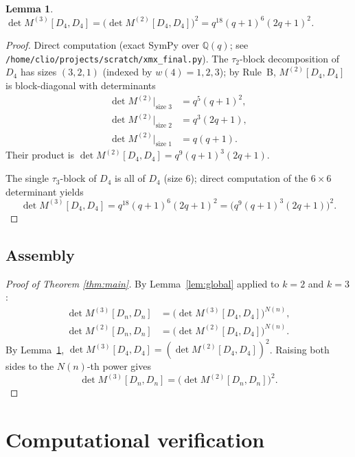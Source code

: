 \documentclass[11pt]{article}
\newtheorem{lemma}[theorem]{Lemma}
\theoremstyle{definition}
\begin{document}
\begin{lemma}
\label{lem:base}
$\det M^{(3)}[D_4, D_4] = \bigl(\det M^{(2)}[D_4, D_4]\bigr)^2 = q^{18}(q+1)^6(2q+1)^2$.
\end{lemma}

\begin{proof}
Direct computation (exact SymPy over $\mathbb{Q}(q)$; see
\texttt{/home/clio/projects/scratch/xmx\_final.py}).
The $\tau_2$-block decomposition of $D_4$ has sizes $(3, 2, 1)$ (indexed by $w(4) = 1, 2, 3$);
by Rule~B, $M^{(2)}[D_4, D_4]$ is block-diagonal with determinants
\begin{align*}
\det M^{(2)}|_{\text{size 3}} &= q^5(q+1)^2, \\
\det M^{(2)}|_{\text{size 2}} &= q^3(2q+1), \\
\det M^{(2)}|_{\text{size 1}} &= q(q+1).
\end{align*}
Their product is $\det M^{(2)}[D_4, D_4] = q^9 (q+1)^3 (2q+1)$.

The single $\tau_3$-block of $D_4$ is all of $D_4$ (size $6$); direct computation of the
$6 \times 6$ determinant yields
\[
\det M^{(3)}[D_4, D_4] = q^{18}(q+1)^6(2q+1)^2 = \bigl(q^9(q+1)^3(2q+1)\bigr)^2.
\]
\end{proof}

\subsection{Assembly}

\begin{proof}[Proof of Theorem \ref{thm:main}]
By Lemma~\ref{lem:global} applied to $k=2$ and $k=3$:
\begin{align*}
\det M^{(3)}[D_n, D_n] &= \bigl(\det M^{(3)}[D_4, D_4]\bigr)^{N(n)}, \\
\det M^{(2)}[D_n, D_n] &= \bigl(\det M^{(2)}[D_4, D_4]\bigr)^{N(n)}.
\end{align*}
By Lemma~\ref{lem:base}, $\det M^{(3)}[D_4, D_4] = (\det M^{(2)}[D_4, D_4])^2$. Raising both
sides to the $N(n)$-th power gives
\[
\det M^{(3)}[D_n, D_n] = \bigl(\det M^{(2)}[D_n, D_n]\bigr)^2.
\]
\end{proof}

\section{Computational verification}
\end{document}
